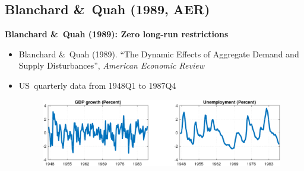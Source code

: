 
\subsection{Blanchard \&\ Quah (1989, AER)}

\begin{frame}
\vspace{3cm} \color{title}%
\bigskip

\color{note}
\end{frame}


\begin{frame}
{\textbf{Blanchard \&\ Quah (1989): Zero long-run restrictions}}

\begin{itemize}
\item Blanchard \&\ Quah (1989). \textquotedblleft The Dynamic Effects of
Aggregate Demand and Supply Disturbances\textquotedblright , \emph{American
Economic Review}\bigskip

\item US\ quarterly data from 1948Q1 to 1987Q4\bigskip

\begin{figure}[h]
\includegraphics[width=.85\textwidth]{BQ_DATA.pdf}
\end{figure}
\end{itemize}
\end{frame}


